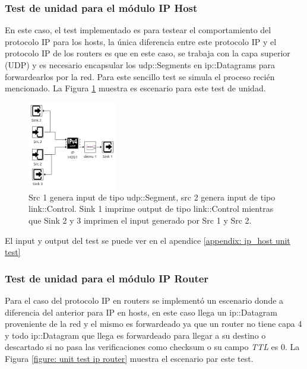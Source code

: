 \documentclass[10pt,a4paper]{article}
\begin{document}
\newpage

\subsubsection{Test de unidad para el módulo IP Host}

En este caso, el test implementado es para testear el comportamiento del protocolo IP para los hosts, la única diferencia entre este protocolo IP y el protocolo IP de los routers es que en este caso, se trabaja con la capa superior (UDP) y es necesario encapsular los udp::Segments en ip::Datagrams para forwardearlos por la red. Para este sencillo test se simula el proceso recién mencionado. La Figura \ref{figure: unit test ip host} muestra es escenario para este test de unidad.

\begin{figure}[!h]
    \centering
    \includegraphics[width = 0.35\textwidth]{img/png/unit_tests/ip_host.png}
    \caption{Src 1 genera input de tipo udp::Segment, src 2 genera input de tipo link::Control. Sink 1 imprime output de tipo link::Control mientras que Sink 2 y 3 imprimen el input generado por Src 1 y Src 2.}
    \label{figure: unit test ip host}
\end{figure}

El input y output del test se puede ver en el apendice \ref{appendix: ip_host unit test}

\subsubsection{Test de unidad para el módulo IP Router}

Para el caso del protocolo IP en routers se implementó un escenario donde a diferencia del anterior para IP en hosts, en este caso llega un ip::Datagram proveniente de la red y el mismo es forwardeado ya que un router no tiene capa 4 y todo ip::Datagram que llega es forwardeado para llegar a su destino o descartado si no pasa las verificaciones como checksum o su campo \textit{TTL} es 0. La Figura \ref{figure: unit test ip router} muestra el escenario par este test.\\
\end{document}
